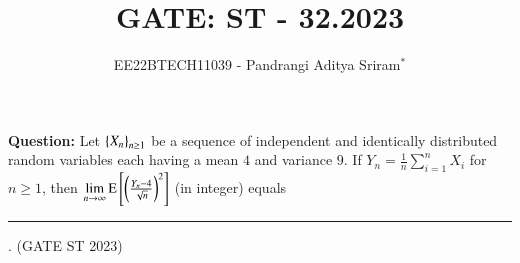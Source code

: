 \documentclass[journal,12pt,twocolumn]{IEEEtran}
\theoremstyle{remark}
\begin{document}

\vspace{3cm}

\title{GATE: ST - 32.2023}
\author{EE22BTECH11039 - Pandrangi Aditya Sriram$^{*}$%
}
\maketitle
\newpage
\bigskip

\renewcommand{\thefigure}{\theenumi}
\renewcommand{\thetable}{\theenumi}


\vspace{3cm}
\textbf{Question:} Let $\left\{X_n\right\}_{n \geq 1}$ be a sequence of independent and identically distributed random variables each having a mean $4$ and variance $9$. If $Y_n = \frac{1}{n} \sum_{i=1}^{n} X_i$ for $n \geq 1$, then $\lim\limits_{n \to \infty} \text{E}{}\left[\left(\frac{Y_n - 4}{\sqrt{n}}\right)^2\right]$ (in integer) equals \rule{2cm}{0.1mm}. \hfill(GATE ST 2023)
\\
\solution
\end{document}

